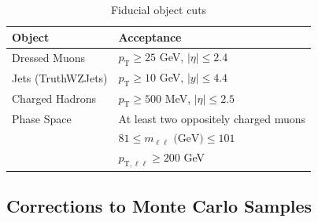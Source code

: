 \begin{table}[h!]
    \centering
    \begin{tabular}{l|l}
    \hline
    \textbf{Object} & \textbf{Acceptance} \\ \hline
    Dressed Muons & $p_\text{T} \geq 25$ GeV, $|\eta| \leq 2.4$ \\\hline
    Jets (TruthWZJets) & $p_\text{T}\geq 10$ GeV, $|y|\leq4.4$ \\\hline
    Charged Hadrons & $p_\text{T} \geq 500$ MeV, $|\eta| \leq 2.5$  \\ \hline
    Phase Space & At least two oppositely charged muons \\
    & $81\leq m_{\ell\ell} \text{ (GeV)}\leq101$ \\
    & $p_{\text{T},\ell\ell}\geq200$ GeV \\ \hline
    \end{tabular}
    \caption{Fiducial object cuts}
    \label{tab:PLObjCuts}
\end{table}

\subsection{Corrections to Monte Carlo Samples}
\label{subsec:MCCorr}

